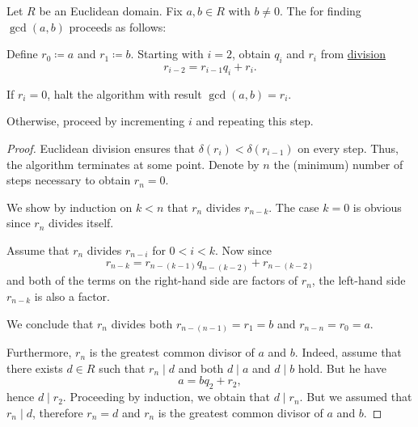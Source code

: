 \begin{algorithm}\label{alg:euclidean_algorithm}
  Let \( R \) be an Euclidean domain. Fix \( a, b \in R \) with \( b \neq 0 \). The  for finding \( \gcd(a, b) \) proceeds as follows:
  \begin{thmenum}
     Define \( r_0 \coloneqq a \) and \( r_1 \coloneqq b \).
     Starting with \( i = 2 \), obtain \( q_i \) and \( r_i \) from \hyperref[def:euclidean_domain]{division}
    \begin{equation*}
      r_{i-2} = r_{i-1} q_i + r_i.
    \end{equation*}

    If \( r_i = 0 \), halt the algorithm with result \( \gcd(a, b) = r_i \).

    Otherwise, proceed by incrementing \( i \) and repeating this step.
  \end{thmenum}
\end{algorithm}
\begin{proof}
  Euclidean division ensures that \( \delta(r_i) < \delta(r_{i-1}) \) on every step. Thus, the algorithm terminates at some point. Denote by \( n \) the (minimum) number of steps necessary to obtain \( r_n = 0 \).

  We show by induction on \( k < n \) that \( r_n \) divides \( r_{n-k} \). The case \( k = 0 \) is obvious since \( r_n \) divides itself.

  Assume that \( r_n \) divides \( r_{n-i} \) for \( 0 < i < k \). Now since
  \begin{equation*}
    r_{n-k} = r_{n-(k-1)} q_{n-(k-2)} + r_{n-(k-2)}
  \end{equation*}
  and both of the terms on the right-hand side are factors of \( r_n \), the left-hand side \( r_{n-k} \) is also a factor.

  We conclude that \( r_n \) divides both \( r_{n-(n-1)} = r_1 = b \) and \( r_{n-n} = r_0 = a \).

  Furthermore, \( r_n \) is the greatest common divisor of \( a \) and \( b \). Indeed, assume that there exists \( d \in R \) such that \( r_n \mid d \) and both \( d \mid a \) and \( d \mid b \) hold. But he have
  \begin{equation*}
    a = b q_2 + r_2,
  \end{equation*}
  hence \( d \mid r_2 \). Proceeding by induction, we obtain that \( d \mid r_n \). But we assumed that \( r_n \mid d \), therefore \( r_n = d \) and \( r_n \) is the greatest common divisor of \( a \) and \( b \).
\end{proof}


